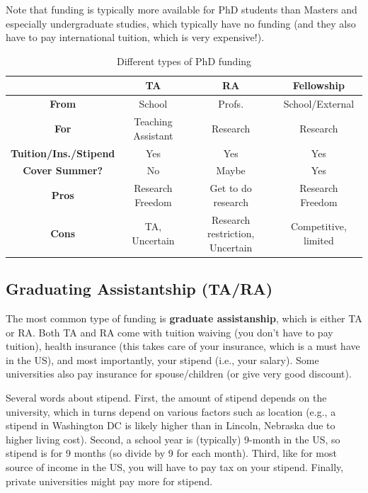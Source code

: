 \documentclass[11pt]{article}
\begin{document}
Note that funding is typically more available for PhD students than 
Masters and especially undergraduate studies, which typically have no funding (and they also have to pay international tuition, which is very expensive!).  

\begin{table}
  \centering
  \footnotesize
  \caption{Different types of PhD funding}\label{tab:funding}
  \begin{tabular}{c|c|c|c}
    \toprule
    &\textbf{TA}&\textbf{RA}&\textbf{Fellowship}\\
    \midrule
    \textbf{From} & School & Profs. & School/External\\
    \textbf{For}                  & Teaching Assistant       & Research                        & Research                              \\
    \textbf{Tuition/Ins./Stipend} & Yes                      & Yes                             & Yes                                   \\
    \textbf{Cover Summer?}              & No                       & Maybe                           & Yes                                   \\
    \midrule
    \textbf{Pros}                 & Research Freedom         & Get to do research              & Research Freedom                      \\
    \textbf{Cons}                 & TA, Uncertain            & Research restriction, Uncertain & Competitive, limited             \\
    \bottomrule
  \end{tabular}
\end{table}

\subsection{Graduating Assistantship (TA/RA)}
The most common type of funding is \textbf{graduate assistanship}, which is either TA or RA. Both TA and RA come with tuition waiving (you don't have to pay tuition), health insurance (this takes care of your insurance, which is a must have in the US), and most importantly, your stipend (i.e., your salary). Some universities also pay insurance for spouse/children (or give very good discount).

Several words about stipend. First, the amount of stipend depends on the university, which in turns depend on various factors such as location (e.g., a stipend in Washington DC is likely higher than in Lincoln, Nebraska due to higher living cost). Second, a school year is (typically) 9-month in the US, so stipend is for 9 months (so divide by 9 for each month). Third, like for most source of income in the US, you will have to pay tax on your stipend. Finally, private universities might pay more for stipend.
\end{document}
